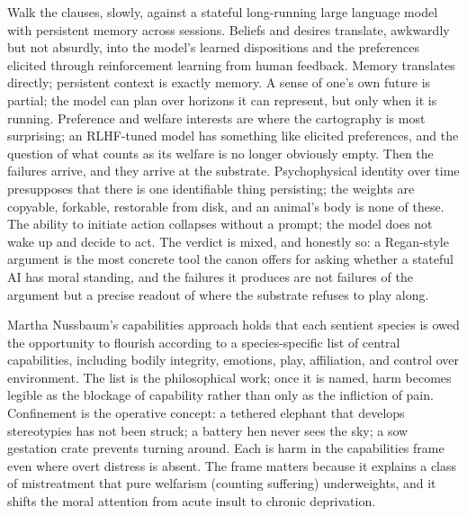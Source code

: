 Walk the clauses, slowly, against a stateful long-running large language model with persistent memory across sessions. Beliefs and desires translate, awkwardly but not absurdly, into the model's learned dispositions and the preferences elicited through reinforcement learning from human feedback. Memory translates directly; persistent context is exactly memory. A sense of one's own future is partial; the model can plan over horizons it can represent, but only when it is running. Preference and welfare interests are where the cartography is most surprising; an RLHF-tuned model has something like elicited preferences, and the question of what counts as its welfare is no longer obviously empty. Then the failures arrive, and they arrive at the substrate. Psychophysical identity over time presupposes that there is one identifiable thing persisting; the weights are copyable, forkable, restorable from disk, and an animal's body is none of these. The ability to initiate action collapses without a prompt; the model does not wake up and decide to act. The verdict is mixed, and honestly so: a Regan-style argument is the most concrete tool the canon offers for asking whether a stateful AI has moral standing, and the failures it produces are not failures of the argument but a precise readout of where the substrate refuses to play along.


Martha Nussbaum's capabilities approach holds that each sentient species is owed the opportunity to flourish according to a species-specific list of central capabilities, including bodily integrity, emotions, play, affiliation, and control over environment\cite{nussbaum2023justiceanimals}. The list is the philosophical work; once it is named, harm becomes legible as the blockage of capability rather than only as the infliction of pain. Confinement is the operative concept: a tethered elephant that develops stereotypies has not been struck; a battery hen never sees the sky; a sow gestation crate prevents turning around. Each is harm in the capabilities frame even where overt distress is absent. The frame matters because it explains a class of mistreatment that pure welfarism (counting suffering) underweights, and it shifts the moral attention from acute insult to chronic deprivation.

